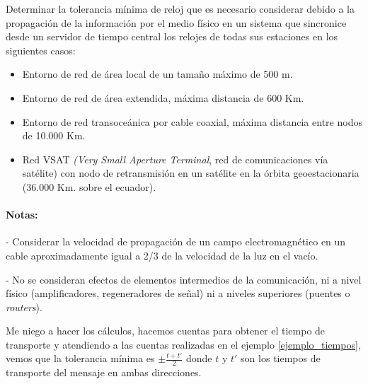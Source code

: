   \begin{problem}[11]
  Determinar la tolerancia mínima de reloj que es necesario considerar
  debido a la propagación de la información por el medio físico en un sistema
  que sincronice desde un servidor de tiempo central los relojes de todas
  sus estaciones en los siguientes casos:
  \begin{itemize}
    \item Entorno de red de área local de un tamaño máximo de 500 m.
    \item Entorno de red de área extendida, máxima distancia de 600 Km.
    \item Entorno de red transoceánica por cable coaxial, máxima distancia entre
nodos de 10.000 Km.
    \item Red VSAT \textit{(Very Small Aperture Terminal}, red de comunicaciones vía
satélite) con nodo de retransmisión en un satélite en la órbita geoestacionaria
(36.000 Km. sobre el ecuador).
  \end{itemize}
  \paragraph{Notas: }
  - Considerar la velocidad de propagación de un campo electromagnético
en un cable aproximadamente igual a 2/3 de la velocidad de la luz en el
vacío.

  - No se consideran efectos de elementos intermedios de la comunicación,
  ni a nivel físico (amplificadores,  regeneradores de señal) ni a niveles
  superiores (puentes o \textit{routers}).

  \solution

  \yoP

  Me niego a hacer los cálculos, hacemos cuentas para obtener el tiempo de transporte y atendiendo a las cuentas realizadas en el ejemplo \ref{ejemplo_tiempos}, vemos que la tolerancia mínima es $\pm\frac{t+t'}{2}$ donde $t$ y $t'$ son los tiempos de transporte del mensaje en ambas direcciones.


  \end{problem}

